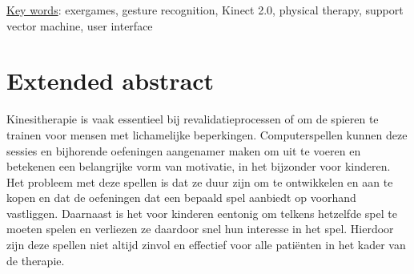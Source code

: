 




\underline{Key words}: exergames, gesture recognition, Kinect 2.0, physical therapy, support vector machine, user interface


\chapter*{Extended abstract}

Kinesitherapie is vaak essentieel bij revalidatieprocessen of om de spieren te trainen voor mensen met lichamelijke beperkingen. Computerspellen kunnen deze sessies en bijhorende oefeningen aangenamer maken om uit te voeren en betekenen een belangrijke vorm van motivatie, in het bijzonder voor kinderen. Het probleem met deze spellen is dat ze duur zijn om te ontwikkelen en aan te kopen en dat de oefeningen dat een bepaald spel aanbiedt op voorhand vastliggen. Daarnaast is het voor kinderen eentonig om telkens hetzelfde spel te moeten spelen en verliezen ze daardoor snel hun interesse in het spel. Hierdoor zijn deze spellen niet altijd zinvol en effectief voor alle pati\"enten in het kader van de therapie.\\

